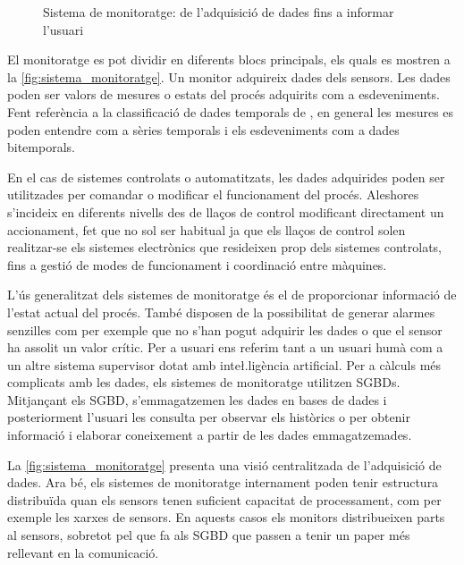 \begin{figure}[tp]
  \begin{center}
    \scriptsize 
    
  \end{center}
  \caption{Sistema de monitoratge: de l'adquisició de dades fins a informar l'usuari}
  \label{fig:sistema_monitoratge}
\end{figure}


El monitoratge es pot dividir en diferents blocs principals, els quals
es mostren a la \autoref{fig:sistema_monitoratge}. Un monitor
adquireix dades dels sensors. Les dades poden ser valors de mesures o
estats del procés adquirits com a esdeveniments. Fent referència a la
classificació de dades temporals de \textcite{assfalg08:thesis}, en
general les mesures es poden entendre com a sèries temporals i els
esdeveniments com a dades bitemporals.

En el cas de sistemes controlats o automatitzats, les dades adquirides
poden ser utilitzades per comandar o modificar el funcionament del
procés. Aleshores s'incideix en diferents nivells des de llaços de
control modificant directament un accionament, fet que no sol ser
habitual ja que els llaços de control solen realitzar-se els sistemes
electrònics que resideixen prop dels sistemes controlats, fins a
gestió de modes de funcionament i coordinació entre màquines.

L'ús generalitzat dels sistemes de monitoratge és el de proporcionar
informació de l'estat actual del procés. També disposen de la
possibilitat de generar alarmes senzilles com per exemple que no s'han
pogut adquirir les dades o que el sensor ha assolit un valor
crític. Per a usuari ens referim tant a un usuari humà com a un altre
sistema supervisor dotat amb inte\l.ligència artificial.
%
Per a càlculs més complicats amb les dades, els sistemes de
monitoratge utilitzen \glspl{SGBD}. Mitjançant els \gls{SGBD},
s'emmagatzemen les dades en bases de dades i posteriorment l'usuari
les consulta per observar els històrics o per obtenir informació i
elaborar coneixement a partir de les dades emmagatzemades.

La \autoref{fig:sistema_monitoratge} presenta una visió centralitzada
de l'adquisició de dades. Ara bé, els sistemes de monitoratge
internament poden tenir estructura distribuïda quan els sensors tenen
suficient capacitat de processament, com per exemple les xarxes de
sensors. En aquests casos els monitors distribueixen parts al sensors,
sobretot pel que fa als \gls{SGBD} que passen a tenir un paper més
rellevant en la comunicació.



